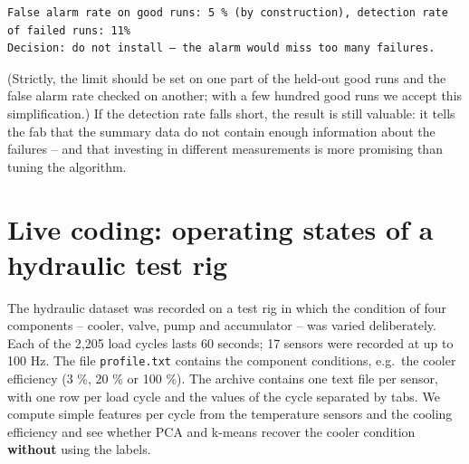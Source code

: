 \documentclass[
  letterpaper,
  DIV=11,
  numbers=noendperiod]{scrreprt}
\begin{document}
\begin{verbatim}
False alarm rate on good runs: 5 % (by construction), detection rate of failed runs: 11%
Decision: do not install – the alarm would miss too many failures.
\end{verbatim}

(Strictly, the limit should be set on one part of the held-out good runs
and the false alarm rate checked on another; with a few hundred good
runs we accept this simplification.) If the detection rate falls short,
the result is still valuable: it tells the fab that the summary data do
not contain enough information about the failures -- and that investing
in different measurements is more promising than tuning the algorithm.

\section{Live coding: operating states of a hydraulic test
rig}\label{live-coding-operating-states-of-a-hydraulic-test-rig}

The hydraulic dataset was recorded on a test rig in which the condition
of four components -- cooler, valve, pump and accumulator -- was varied
deliberately. Each of the 2,205 load cycles lasts 60 seconds; 17 sensors
were recorded at up to 100 Hz. The file \texttt{profile.txt} contains
the component conditions, e.g.~the cooler efficiency (3 \%, 20 \% or 100
\%). The archive contains one text file per sensor, with one row per
load cycle and the values of the cycle separated by tabs. We compute
simple features per cycle from the temperature sensors and the cooling
efficiency and see whether PCA and k-means recover the cooler condition
\textbf{without} using the labels.
\end{document}
